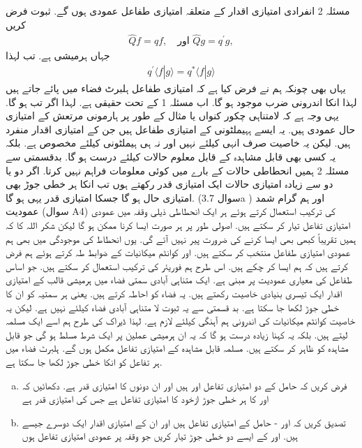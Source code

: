 مسئلہ 2
انفرادی امتیازی اقدار کے متعلقہ امتیازی طفاعل عمودی ہوں گے. 
ثبوت 
فرض کریں 
\begin{align*}
\hat{Q}f = qf,  \quad \text{اور } \hat{Q}g=q^{'}g, 
\end{align*}
جہاں  ہرمیشی ہے. تب  لہذا
\begin{align*}
q^{'} \langle f | g \rangle = q^{*} \langle f | g \rangle
\end{align*}
یہاں بھی چونکہ ہم نے فرض کیا ہے کہ امتیازی طفاعل ہلبرٹ فضاء میں پائے جاتے ہیں لہذا انکا اندرونی ضرب موجود ہو گا. اب مسئلہ 1 کے تحت  حقیقی ہے. لہذا اگر  تب  ہو گا. 
یہی وجہ ہے کہ لامتناہی چکور کنواں یا مثال کے طور پر ہارمونی مرتعش کے امتیازی حال عمودی ہیں. یہ ایسے ہہیملٹونی کے امتیازی طفاعل ہیں جن کے امتیازی اقدار منفرد ہیں. لیکن یہ خاصیت صرف انہی کیلئے نہیں اور نہ ہی ہیملٹونی کیلئے مخصوص ہے. بلکہ یہ کسی بھی قابل مشاہدہ کے قابل معلوم حالات کیلئے درست ہو گا. بدقسمتی سے مسئلہ 2 ہمیں انحطاطی حالات  کے بارے میں کوئی معلومات فراہم نہیں کرتا. اگر دو یا دو سے زیادہ امتیازی حالات ایک امتیازی قدر رکھتے ہوں تب انکا ہر خطی جوڑ بھی امتیازی حال ہو گا جسکا امتیازی قدر یہی ہو گا. (سوال 3.7a   )  اور ہم گرام شمد عمودیت (سوال A4) کی ترکیب استعمال کرتے ہوئے ہر ایک انحطاطی ذیلی وقفہ میں عمودی امتیازی تفاعل تیار کر سکتے ہیں. اصولی طور پر ہر صورت ایسا کرنا ممکن ہو گا لیکن شکر اللہ کا کہ ہمیں تقریباً کبھی بھی ایسا کرنے کی ضرورت پیر نہیں آئے گی. یوں انحطاط کی موجودگی میں بھی ہم عمودی امتیازی طفاعل منتخب کر سکتے ہیں. اور کوانٹم میکانیات کے ضوابط طہ کرتے ہوئے ہم فرض کرتے ہیں کہ ہم ایسا کر چکے ہیں. اس طرح ہم فوریئر کی ترکیب استعمال کر سکتے ہیں. جو اساس طفاعل کی معیاری عمودیت پر مبنی ہے. ایک متناہی آبادی سمتی فضاء میں ہرمیشی قالب کے امتیازی اقدار ایک تیسری بنیادی خاصیت رکھتے ہیں. یہ فضاء کو احاطہ کرتے ہیں. یعنی ہر سمتیہ کو ان کا خطی جوڑ لکھا جا سکتا ہے. بد قسمتی سے یہ ثبوت لا متناہی آبادی فضاء کیلئے نہیں ہے. لیکن یہ خاصیت کوانٹم میکانیات کی اندرونی ہم آہنگی کیلئے لازم ہے. لہذا ڈیراک کی طرح ہم اسے ایک مسلمہ لیتے ہیں. بلکہ یہ کہنا زیادہ درست ہو گا کہ یہ ان ہرمیشی عملین پر ایک شرط مسلط ہو گی جو قابل مشاہدہ کو ظاہر کر سکتے ہیں. مسلمہ قابل مشاہدہ کے امتیازی تفاعل مکمل ہوں گے. ہلبرٹ فضاء میں ہر تفاعل کو انکا خطی جوڑ لکھا جا سکتا ہے.
\begin{enumerate}[a.]
\item  فرض کریں کہ حامل  کے دو امتیازی تفاعل  اور   ہیں اور ان دونوں کا امتیازی قدر  ہے. دکھائیں کہ  اور  کا ہر خطی جوڑ ازخود  کا امتیازی تفاعل ہے جس کی امتیازی قدر  ہے
\item تصدیق کریں کہ  اور  - حامل  کے امتیازی تفاعل ہیں اور ان کے امتیازی اقدار ایک دوسرے جیسے ہیں.  اور  کے ایسے دو خطی جوڑ تیار کریں جو وقفہ  پر عمودی امتیازی تفاعل ہوں 
\end{enumerate}
